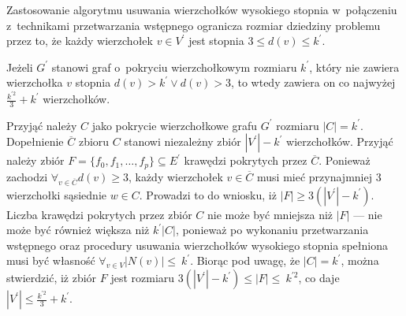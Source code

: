 Zastosowanie algorytmu usuwania wierzchołków wysokiego stopnia w~połączeniu 
z~technikami przetwarzania wstępnego ogranicza rozmiar dziedziny problemu przez
to, że każdy wierzchołek $v \in V^\prime$ jest stopnia $3 \leq d(v) \leq k^\prime$.

\begin{theorem}
  Jeżeli $G^\prime$ stanowi graf o~pokryciu wierzchołkowym rozmiaru $k^\prime$, który nie zawiera wierzchołka $v$ stopnia $d(v) > k^\prime \lor d(v) > 3$, to
  wtedy zawiera on co najwyżej $\frac{k^{\prime2}}{3} + k^\prime$ wierzchołków.
\end{theorem}
\begin{bproof}
  Przyjąć należy $C$ jako pokrycie wierzchołkowe grafu $G^\prime$ rozmiaru $|C|=k^\prime$.
  Dopełnienie $\overline{C}$ zbioru $C$ stanowi niezależny zbiór
  $|V^\prime|-k^\prime$ wierzchołków.
  Przyjąć należy zbiór $F=\{f_0,f_1, \ldots, f_p\} \subseteq E^\prime$ krawędzi pokrytych przez $\overline{C}$.
  Ponieważ zachodzi $\forall_{v \in \overline{C}}{d(v) \geq 3}$, każdy
  wierzchołek $v \in \overline{C}$ musi mieć przynajmniej 3 wierzchołki sąsiednie
  $w \in C$.
  Prowadzi to do wniosku, iż $|F| \geq 3(|V^\prime| - k^\prime)$.
  Liczba krawędzi pokrytych przez zbiór $C$ nie może być mniejsza niż $|F|$ --- nie
  może być również większa niż $k^\prime|C|$, ponieważ po wykonaniu
  przetwarzania wstępnego oraz procedury usuwania wierzchołków wysokiego stopnia spełniona musi być własność $\forall_{v \in V}{|N(v)|\leq~k^\prime}$.
  Biorąc pod uwagę, że $|C|=k^\prime$, można stwierdzić, iż zbiór $F$ jest rozmiaru ${3(|V^\prime|-k^\prime)\leq|F|\leq~k^{\prime2}}$, co daje ${|V^\prime|\leq\frac{k^{\prime2}}{3}+k^\prime}$.
\end{bproof}


